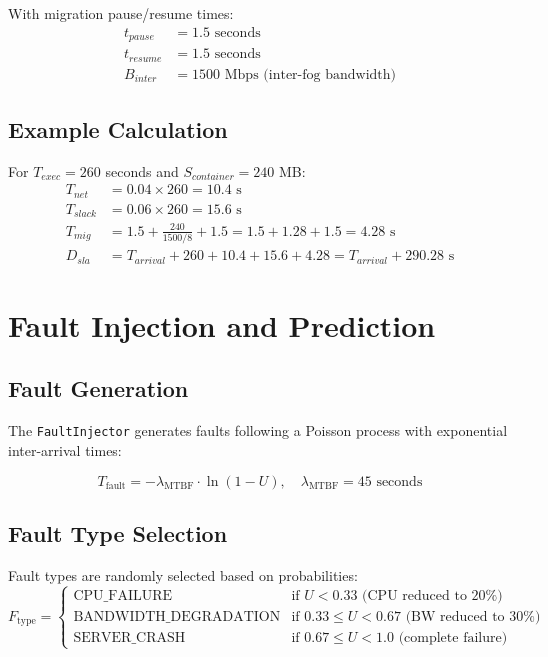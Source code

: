 \documentclass[12pt,a4paper]{article}
\begin{document}
With migration pause/resume times:
\begin{align}
    t_{pause} &= 1.5 \text{ seconds} \\
    t_{resume} &= 1.5 \text{ seconds} \\
    B_{inter} &= 1500 \text{ Mbps (inter-fog bandwidth)}
\end{align}

\subsection{Example Calculation}

For $T_{exec} = 260$ seconds and $S_{container} = 240$ MB:
\begin{align}
    T_{net} &= 0.04 \times 260 = 10.4 \text{ s} \\
    T_{slack} &= 0.06 \times 260 = 15.6 \text{ s} \\
    T_{mig} &= 1.5 + \frac{240}{1500/8} + 1.5 = 1.5 + 1.28 + 1.5 = 4.28 \text{ s} \\
    D_{sla} &= T_{arrival} + 260 + 10.4 + 15.6 + 4.28 = T_{arrival} + 290.28 \text{ s}
\end{align}

\section{Fault Injection and Prediction}

\subsection{Fault Generation}

The \texttt{FaultInjector} generates faults following a Poisson process with exponential inter-arrival times:

\begin{equation}
    T_{\text{fault}} = -\lambda_{\text{MTBF}} \cdot \ln(1 - U), \quad \lambda_{\text{MTBF}} = 45 \text{ seconds}
\end{equation}

\subsection{Fault Type Selection}

Fault types are randomly selected based on probabilities:
\begin{equation}
    F_{\text{type}} = \begin{cases}
        \text{CPU\_FAILURE} & \text{if } U < 0.33 \text{ (CPU reduced to 20\%)} \\
        \text{BANDWIDTH\_DEGRADATION} & \text{if } 0.33 \leq U < 0.67 \text{ (BW reduced to 30\%)} \\
        \text{SERVER\_CRASH} & \text{if } 0.67 \leq U < 1.0 \text{ (complete failure)}
    \end{cases}
\end{equation}
\end{document}
